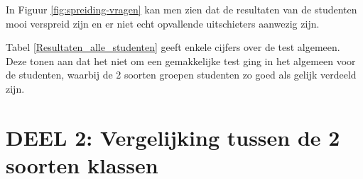 In Figuur \ref{fig:spreiding-vragen} kan men zien dat de resultaten van de studenten mooi verspreid zijn en er niet echt opvallende uitschieters aanwezig zijn.

\begin{table}[]
	\centering
	\caption{Samenvatting resultaten alle geteste studenten}
	\label{Resultaten_alle_studenten}
\end{table}

Tabel \ref{Resultaten_alle_studenten} geeft enkele cijfers over de test algemeen. Deze tonen aan dat het niet om een gemakkelijke test ging in het algemeen voor de studenten, waarbij de 2 soorten groepen studenten zo goed als gelijk verdeeld zijn.

\section{DEEL 2: Vergelijking tussen de 2 soorten klassen}
\label{sec:vragen_res2}


